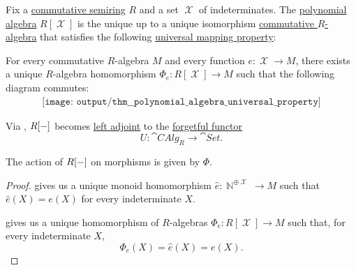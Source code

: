 \begin{theorem}\label{thm:polynomial_algebra_universal_property}
  Fix a \hyperref[def:semiring/commutative]{commutative semiring} \( R \) and a set \( \mscrX \) of indeterminates. The \hyperref[def:polynomial_algebra]{polynomial algebra} \( R[\mscrX] \) is the unique up to a unique isomorphism \hyperref[def:algebra_over_semiring/commutative]{commutative \( R \)-algebra} that satisfies the following \hyperref[rem:universal_mapping_property]{universal mapping property}:
  \begin{displayquote}
    For every commutative \( R \)-algebra \( M \) and every function \( e: \mscrX \to M \), there exists a unique \( R \)-algebra homomorphism \( \Phi_e: R[\mscrX] \to M \) such that the following diagram commutes:
    \begin{equation}\label{eq:thm:polynomial_algebra_universal_property/diagram}
      \begin{aligned}
        \texttt{[image: output/thm\_\_polynomial\_algebra\_universal\_property]}
      \end{aligned}
    \end{equation}
  \end{displayquote}
\end{theorem}
\begin{comments}
  \item Via , \( R[\anon*] \) becomes \hyperref[def:category_adjunction]{left adjoint} to the \hyperref[def:concrete_category]{forgetful functor}
  \begin{equation*}
    U: \cat{CAlg}_R \to \cat{Set}.
  \end{equation*}

  The action of \( R[\anon*] \) on morphisms is given by \( \Phi \).
\end{comments}
\begin{proof}
   gives us a unique monoid homomorphism \( \widehat{e}: \BbbN^{\oplus \mscrX} \to M \) such that \( \widehat{e}(X) = e(X) \) for every indeterminate \( X \).

   gives us a unique homomorphism of \( R \)-algebras \( \Phi_e: R[\mscrX] \to M \) such that, for every indeterminate \( X \),
  \begin{equation*}
    \Phi_e(X) = \widehat{e}(X) = e(X).
  \end{equation*}
\end{proof}

